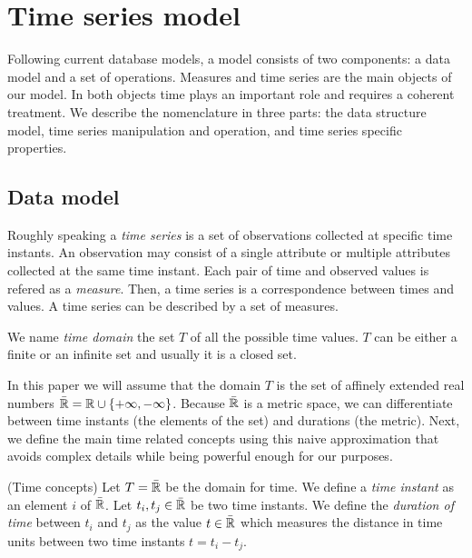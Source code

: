 
\section{Time series model}
\label{sec:model:TSMS}

Following current database models, a  model consists of two
components: a data model and a set of operations. Measures and time
series are the main objects of our  model. In both objects
time plays an important role and requires a coherent treatment.
%
We describe the  nomenclature in three
parts: the data structure model, time series manipulation and
operation, and time series specific properties.


\subsection{Data model}

Roughly speaking a \emph{time series} is a set of observations
collected at specific time instants. An observation may consist of a
single attribute or multiple attributes collected at the same time
instant.  Each pair of time and observed values is refered as a
\emph{measure}. Then, a time series is a correspondence between times
and values. A time series can be described by a set of measures.

We name \emph{time domain} the set $T$ of all the possible time
values. $T$ can be either a finite or an infinite set and usually it
is a closed set. 

In this paper we will assume that the domain $T$ is the set of
affinely extended real numbers $\bar{\mathbb{R}} = \mathbb{R} \cup
\{+\infty,-\infty\}$. Because $\bar{\mathbb{R}}$ is a metric space, we can
differentiate between time instants (the elements of the set) and
durations (the metric). Next, we define the main time related concepts
using this naive approximation that avoids complex details while being
powerful enough for our purposes.

\begin{definition}(Time concepts)
  \label{def:model:temps}
  Let $T=\bar{\mathbb{R}}$ be the domain for time.
  We define a \emph{time instant} as an element $i$ of $\bar{\mathbb{R}}$.
  Let $t_i,t_j\in\bar{\mathbb{R}}$ be two time instants.  We define the
  \emph{duration of time} between $t_i$ and $t_j$ as the value $t \in
  \bar{\mathbb{R}}$ which measures the distance in time units between two time
  instants $t = t_i - t_j$.
\end{definition}

